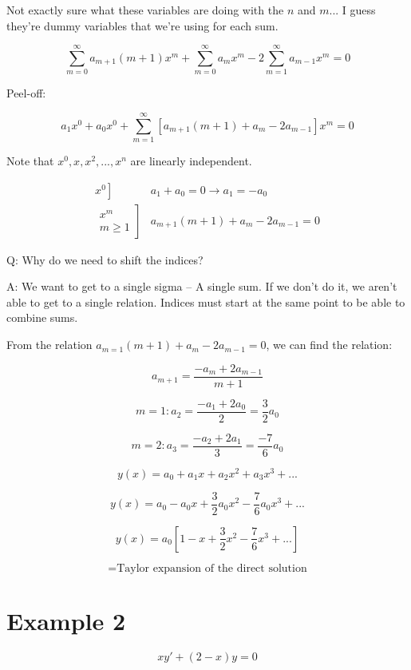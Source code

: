 \documentclass{article}
\begin{document}
Not exactly sure what these variables are doing with the $n$ and $m$... I guess they're dummy variables that we're using for each sum. 

$$ \sum_{m = 0}^{\infty} a_{m+1} (m+1)x^m + \sum_{m = 0}^{\infty} a_m x^m - 2 \sum_{m = 1}^{\infty} a_{m-1} x^m = 0$$

Peel-off:

$$a_1 x^0 + a_0 x^0 + \sum_{m = 1}^{\infty} \left[a_{m+1} (m+1) + a_m - 2 a_{m-1} \right] x^m = 0$$

Note that $x^0, x, x^2, ..., x^n$ are linearly independent. 


$$\begin{matrix} \left. x^0 \right] & a_1 + a_0 = 0 \to a_1 = - a_0 \\

\left. \begin{matrix} x^m\\ m \geq 1 \end{matrix} \right] & a_{m+1} (m+1) + a_m - 2 a_{m-1} = 0 \end{matrix}$$

Q: Why do we need to shift the indices?

A: We want to get to a single sigma -- A single sum. If we don't do it, we aren't able to get to a single relation. Indices must start at the same point to be able to combine sums. 

From the relation $a_{m=1} (m+1) + a_m - 2 a_{m-1} = 0$, we can find the relation:

$$a_{m+1} = \frac{-a_m + 2 a_{m-1}}{m+1}$$

$$m = 1: a_2 = \frac{-a_1 + 2 a_0}{2} = \frac{3}{2} a_0$$

$$m = 2: a_3 = \frac{-a_2 + 2 a_1}{3} = \frac{-7}{6} a_0$$

$$y(x) = a_0 + a_1 x + a_2 x^2 + a_3 x^3 + ...$$

$$ y(x) = a_0 - a_0 x + \frac{3}{2} a_0 x^2 - \frac{7}{6} a_0 x^3 + ...$$

$$y(x) = a_0 \left[ 1 - x + \frac{3}{2} x^2 - \frac{7}{6} x^3 + ... 
\right]$$

$$ = \text{Taylor expansion of the direct solution}$$

\section{Example 2}

$$ x y' + (2 - x) y = 0$$
\end{document}
